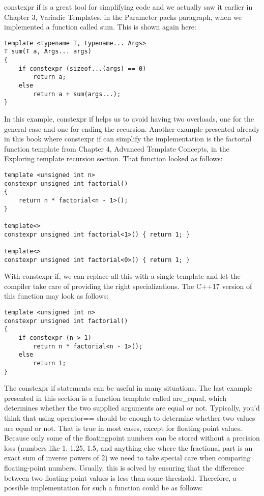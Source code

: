 constexpr if is a great tool for simplifying code and we actually saw it earlier in Chapter 3, Variadic Templates, in the Parameter packs paragraph, when we implemented a function called sum. This is shown again here:

\begin{lstlisting}[style=styleCXX]
template <typename T, typename... Args>
T sum(T a, Args... args)
{
	if constexpr (sizeof...(args) == 0)
		return a;
	else
		return a + sum(args...);
}
\end{lstlisting}

In this example, constexpr if helps us to avoid having two overloads, one for the general case and one for ending the recursion. Another example presented already in this book where constexpr if can simplify the implementation is the factorial function template from Chapter 4, Advanced Template Concepts, in the Exploring template recursion section. That function looked as follows:

\begin{lstlisting}[style=styleCXX]
template <unsigned int n>
constexpr unsigned int factorial()
{
	return n * factorial<n - 1>();
}

template<>
constexpr unsigned int factorial<1>() { return 1; }

template<>
constexpr unsigned int factorial<0>() { return 1; }
\end{lstlisting}

With constexpr if, we can replace all this with a single template and let the compiler take care of providing the right specializations. The C++17 version of this function may look as follows:

\begin{lstlisting}[style=styleCXX]
template <unsigned int n>
constexpr unsigned int factorial()
{
	if constexpr (n > 1)
		return n * factorial<n - 1>();
	else
		return 1;
}
\end{lstlisting}

The constexpr if statements can be useful in many situations. The last example presented in this section is a function template called are\_equal, which determines whether the two supplied arguments are equal or not. Typically, you’d think that using operator== should be enough to determine whether two values are equal or not. That is true in most cases, except for floating-point values. Because only some of the floatingpoint numbers can be stored without a precision loss (numbers like 1, 1.25, 1.5, and anything else where the fractional part is an exact sum of inverse powers of 2) we need to take special care when comparing floating-point numbers. Usually, this is solved by ensuring that the difference between two floating-point values is less than some threshold. Therefore, a possible implementation for such a function could be as follows:


